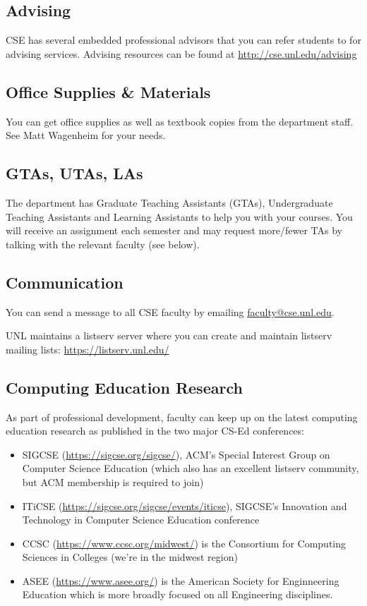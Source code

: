 \documentclass[12pt]{scrartcl}
\begin{document}
\subsection{Advising}

CSE has several embedded professional advisors that you can
refer students to for advising services.  Advising resources
can be found at \url{http://cse.unl.edu/advising} 

\subsection{Office Supplies \& Materials}

You can get office supplies as well as textbook copies from the
department staff.  See Matt Wagenheim for your needs.

\subsection{GTAs, UTAs, LAs}

The department has Graduate Teaching Assistants (GTAs), 
Undergraduate Teaching Assistants and Learning Assistants
to help you with your courses.  You will receive an assignment
each semester and may request more/fewer TAs by talking
with the relevant faculty (see below).

\subsection{Communication}

You can send a message to all CSE faculty by emailing 
\href{mailto:faculty@cse.unl.edu}{faculty@cse.unl.edu}. 

UNL maintains a listserv server where you can create and
maintain listserv mailing lists: \url{https://listserv.unl.edu/}

\subsection{Computing Education Research}

As part of professional development, faculty can keep up
on the latest computing education research as published in 
the two major CS-Ed conferences:
\begin{itemize}
  \item SIGCSE (\url{https://sigcse.org/sigcse/}), ACM's Special Interest Group on Computer Science Education (which also has an excellent listserv community, but ACM membership is required to join)
  \item ITiCSE (\url{https://sigcse.org/sigcse/events/iticse}), SIGCSE's Innovation and Technology in Computer Science Education conference
  \item CCSC (\url{https://www.ccsc.org/midwest/}) is the Consortium for Computing Sciences in Colleges (we're in the midwest region)
  \item ASEE (\url{https://www.asee.org/}) is the American Society for Enginneering Education which is more broadly focused on all Engineering disciplines.  
\end{itemize}
\end{document}
